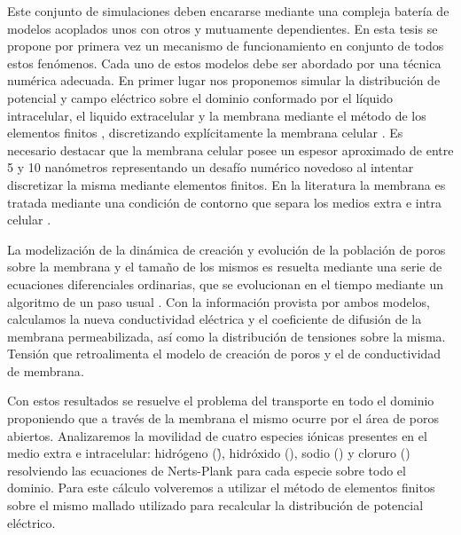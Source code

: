 Este conjunto de simulaciones deben encararse mediante una compleja batería de modelos acoplados unos con otros y mutuamente dependientes. En esta tesis se propone por primera vez un mecanismo de funcionamiento en conjunto de todos estos fenómenos. Cada uno de estos modelos debe ser abordado por una técnica numérica adecuada. En primer lugar nos proponemos simular la distribución de potencial y campo eléctrico sobre el dominio conformado por el líquido intracelular, el liquido extracelular y la membrana mediante el método de los elementos finitos \cite{c9-fem-electro, zien}, discretizando explícitamente la membrana celular \cite{c8}. Es necesario destacar que la membrana celular posee un espesor aproximado de entre 5 y 10 nanómetros representando un desafío numérico novedoso al intentar discretizar la misma mediante elementos finitos. En la literatura la membrana es tratada mediante una condición de contorno que separa los medios extra e intra celular \cite{c12}.

La modelización de la dinámica de creación y evolución de la población de poros sobre la membrana y el tamaño de los mismos es resuelta mediante una serie de ecuaciones diferenciales ordinarias, que se evolucionan en el tiempo mediante un algoritmo de un paso usual \cite{c15}. Con la información provista por ambos modelos, calculamos la nueva conductividad eléctrica y el coeficiente de difusión de la membrana permeabilizada, así como la distribución de tensiones sobre la misma. Tensión que retroalimenta el modelo de creación de poros y el de conductividad de membrana\cite{c13}.

Con estos resultados se resuelve el problema del transporte en todo el dominio proponiendo que a través de la membrana el mismo ocurre por el área de poros abiertos. Analizaremos la movilidad de cuatro especies iónicas presentes en el medio extra e intracelular: hidrógeno (\h), hidróxido (\oh), sodio (\na) y cloruro (\cl) resolviendo las ecuaciones de Nerts-Plank para cada especie sobre todo el dominio. Para este cálculo volveremos a utilizar el método de elementos finitos sobre el mismo mallado utilizado para recalcular la distribución de potencial eléctrico.

